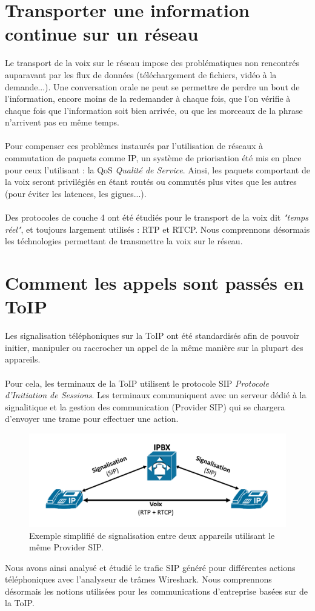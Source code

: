 \section{Transporter une information continue sur un réseau}

Le transport de la voix sur le réseau impose des problématiques non rencontrés auparavant par les flux de données (téléchargement de fichiers, vidéo à la demande...). Une conversation orale ne peut se permettre de perdre un bout de l'information, encore moins de la redemander à chaque fois, que l'on vérifie à chaque fois que l'information soit bien arrivée, ou que les morceaux de la phrase n'arrivent pas en même temps.
\\ \\
Pour compenser ces problèmes instaurés par l'utilisation de réseaux à commutation de paquets comme IP, un système de priorisation été mis en place pour ceux l'utilisant : la QoS \textit{Qualité de Service}. Ainsi, les paquets comportant de la voix seront privilégiés en étant routés ou commutés plus vites que les autres (pour éviter les latences, les gigues...).
\\ \\
Des protocoles de couche 4 ont été étudiés pour le transport de la voix dit \textit{"temps réel"}, et toujours largement utilisés : RTP et RTCP. Nous comprennons désormais les téchnologies permettant de transmettre la voix sur le réseau.

\section{Comment les appels sont passés en ToIP}

Les signalisation téléphoniques sur la ToIP ont été standardisés afin de pouvoir initier, manipuler ou raccrocher un appel de la même manière sur la plupart des appareils.
\\ \\
Pour cela, les terminaux de la ToIP utilisent le protocole SIP \textit{Protocole d'Initiation de Sessions}. Les terminaux communiquent avec un serveur dédié à la signalitique et la gestion des communication (Provider SIP) qui se chargera d'envoyer une trame pour effectuer une action.

\begin{figure}[H]
      \centering
      \includegraphics[width=\textwidth - \textwidth / 3]{ressources/r3rom16/01.png}
      \caption{Exemple simplifié de signalisation entre deux appareils utilisant le même Provider SIP.}
      \label{fig:echantillonnage}
\end{figure}

\noindent Nous avons ainsi analysé et étudié le trafic SIP généré pour différentes actions téléphoniques avec l'analyseur de trâmes Wireshark. Nous comprennons désormais les notions utilisées pour les communications d'entreprise basées sur de la ToIP.